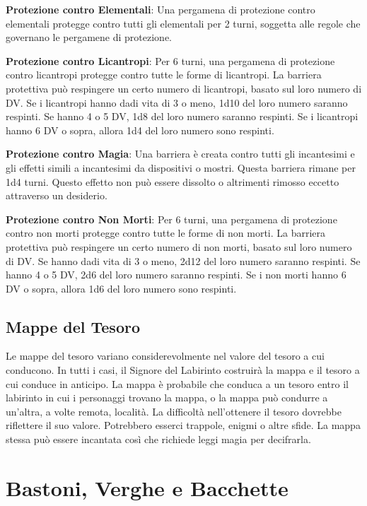 \documentclass{article}
\begin{document}
\begin{multicols}{2}
\textbf{Protezione contro Elementali}: Una pergamena di protezione contro elementali protegge contro tutti gli elementali per 2 turni, soggetta alle regole che governano le pergamene di protezione.

\textbf{Protezione contro Licantropi}: Per 6 turni, una pergamena di protezione contro licantropi protegge contro tutte le forme di licantropi. La barriera protettiva può respingere un certo numero di licantropi, basato sul loro numero di DV. Se i licantropi hanno dadi vita di 3 o meno, 1d10 del loro numero saranno respinti. Se hanno 4 o 5 DV, 1d8 del loro numero saranno respinti. Se i licantropi hanno 6 DV o sopra, allora 1d4 del loro numero sono respinti.

\textbf{Protezione contro Magia}: Una barriera è creata contro tutti gli incantesimi e gli effetti simili a incantesimi da dispositivi o mostri. Questa barriera rimane per 1d4 turni. Questo effetto non può essere dissolto o altrimenti rimosso eccetto attraverso un desiderio.

\textbf{Protezione contro Non Morti}: Per 6 turni, una pergamena di protezione contro non morti protegge contro tutte le forme di non morti. La barriera protettiva può respingere un certo numero di non morti, basato sul loro numero di DV. Se hanno dadi vita di 3 o meno, 2d12 del loro numero saranno respinti. Se hanno 4 o 5 DV, 2d6 del loro numero saranno respinti. Se i non morti hanno 6 DV o sopra, allora 1d6 del loro numero sono respinti.

\subsection{Mappe del Tesoro}

Le mappe del tesoro variano considerevolmente nel valore del tesoro a cui conducono. In tutti i casi, il Signore del Labirinto costruirà la mappa e il tesoro a cui conduce in anticipo. La mappa è probabile che conduca a un tesoro entro il labirinto in cui i personaggi trovano la mappa, o la mappa può condurre a un'altra, a volte remota, località. La difficoltà nell'ottenere il tesoro dovrebbe riflettere il suo valore. Potrebbero esserci trappole, enigmi o altre sfide. La mappa stessa può essere incantata così che richiede leggi magia per decifrarla.

\section{Bastoni, Verghe e Bacchette}


\end{multicols}
\end{document}
